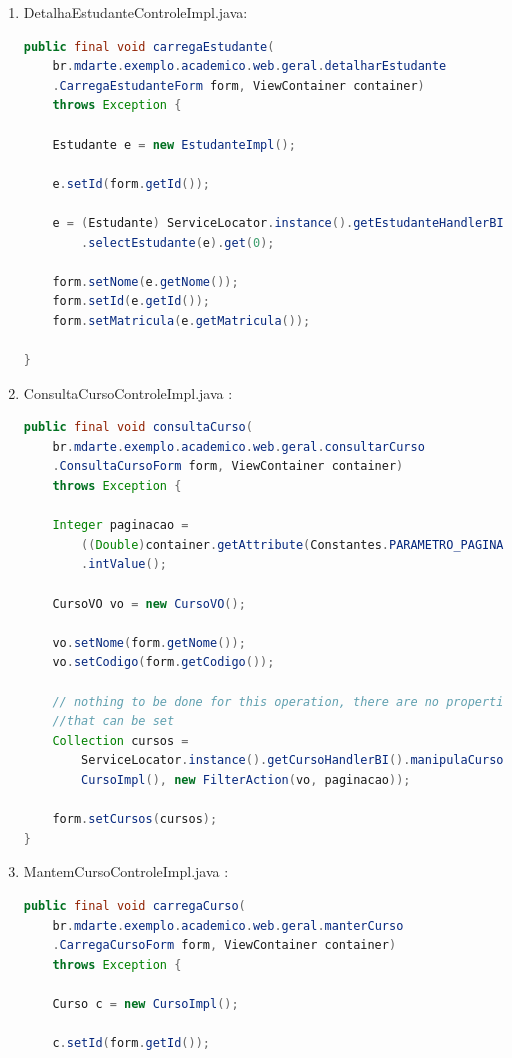 \begin{enumerate}
\begin{lstlisting}[language=java]
}
\end{lstlisting}

\item DetalhaEstudanteControleImpl.java:
\begin{lstlisting}[language=java]
public final void carregaEstudante(
	br.mdarte.exemplo.academico.web.geral.detalharEstudante
	.CarregaEstudanteForm form, ViewContainer container) 
	throws Exception {
	
	Estudante e = new EstudanteImpl();
    	
   	e.setId(form.getId());
    	
   	e = (Estudante) ServiceLocator.instance().getEstudanteHandlerBI()
   		.selectEstudante(e).get(0);

   	form.setNome(e.getNome());
   	form.setId(e.getId());
   	form.setMatricula(e.getMatricula());
 	
}
\end{lstlisting}

\item ConsultaCursoControleImpl.java :
\begin{lstlisting}[language=java]
public final void consultaCurso(
	br.mdarte.exemplo.academico.web.geral.consultarCurso
	.ConsultaCursoForm form, ViewContainer container) 
	throws Exception {
    		
    Integer paginacao = 
    	((Double)container.getAttribute(Constantes.PARAMETRO_PAGINA))
    	.intValue();
    		
    CursoVO vo = new CursoVO();
    	
    vo.setNome(form.getNome());
    vo.setCodigo(form.getCodigo());
    	
    // nothing to be done for this operation, there are no properties 
    //that can be set
    Collection cursos = 
    	ServiceLocator.instance().getCursoHandlerBI().manipulaCurso(new
    	CursoImpl(), new FilterAction(vo, paginacao));
    	
    form.setCursos(cursos);	
}
\end{lstlisting}

\item MantemCursoControleImpl.java :
\begin{lstlisting}[language=java]
 public final void carregaCurso(
 	br.mdarte.exemplo.academico.web.geral.manterCurso
 	.CarregaCursoForm form, ViewContainer container) 
 	throws Exception {

   	Curso c = new CursoImpl();
    	
   	c.setId(form.getId());
    	

\end{lstlisting}
\end{enumerate}
